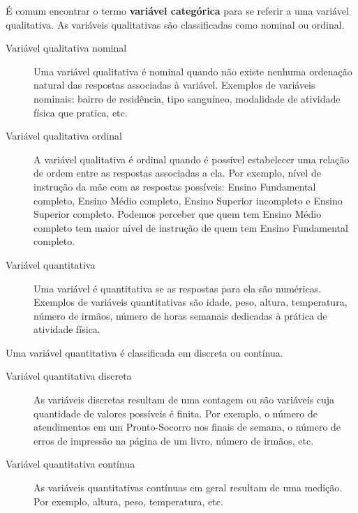 É comum encontrar o termo \textbf{variável categórica} para se referir a uma variável qualitativa. As variáveis qualitativas são classificadas como nominal ou ordinal.

\begin{description}
\item[{Variável qualitativa nominal}] \leavevmode{}\label{est1-def-8}
Uma variável qualitativa é nominal quando não existe nenhuma ordenação natural das respostas associadas à variável. Exemplos de variáveis nominais: bairro de residência, tipo sanguíneo, modalidade de atividade física que pratica, etc.
\end{description}

\begin{description}
\item[{Variável qualitativa ordinal}] \leavevmode{}\label{est1-def-9}
A variável qualitativa é ordinal quando é possível estabelecer uma relação de ordem entre as respostas associadas a ela. Por exemplo, nível de instrução da mãe com as respostas possíveis: Ensino Fundamental completo, Ensino Médio completo, Ensino Superior incompleto e Ensino Superior completo. Podemos perceber que quem tem Ensino Médio completo tem maior nível de instrução de quem tem Ensino Fundamental completo.
\end{description}

\begin{description}
\item[{Variável quantitativa}] \leavevmode{}\label{est1-def-10}
Uma variável é quantitativa se as respostas para ela são numéricas. Exemplos de variáveis quantitativas são idade, peso, altura, temperatura, número de irmãos, número de horas semanais dedicadas à prática de atividade física.
\end{description}

Uma variável quantitativa é classificada em discreta ou contínua.

\begin{description}
\item[{Variável quantitativa discreta}] \leavevmode{}\label{est1-def-11}
As variáveis discretas resultam de uma contagem ou são variáveis cuja quantidade de valores possíveis é finita. Por exemplo, o número de atendimentos em um Pronto-Socorro nos finais de semana, o número de erros de impressão na página de um livro, número de irmãos, etc.

\end{description}
\begin{description}
\item[{Variável quantitativa contínua}] \leavevmode{}\label{est1-def-12}
As variáveis quantitativas contínuas em geral resultam de uma medição. Por exemplo, altura, peso, temperatura, etc.
\end{description}


